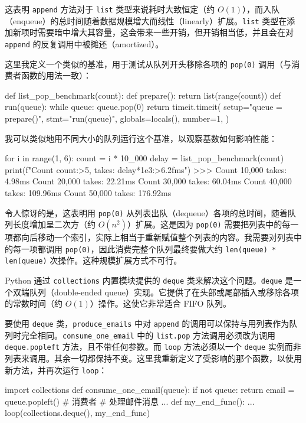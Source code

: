 这表明 \texttt{append} 方法对于 \texttt{list} 类型来说耗时大致恒定（约 $O(1)$），而入队（enqueue）的总时间随着数据规模增大而线性（linearly）扩展。\texttt{list} 类型在添加新项时需要暗中增大其容量，这会带来一些开销，但开销相当低，并且会在对 \texttt{append} 的反复调用中被摊还（amortized）。

这里我定义一个类似的基准，用于测试从队列开头移除各项的 \texttt{pop(0)} 调用（与消费者函数的用法一致）：

\begin{codebox}[python]
def list_pop_benchmark(count):
    def prepare():
        return list(range(count))
    def run(queue):
        while queue:
            queue.pop(0)
    return timeit.timeit(
        setup="queue = prepare()",
        stmt="run(queue)",
        globals=locals(),
        number=1,
    )
\end{codebox}

我可以类似地用不同大小的队列运行这个基准，以观察基数如何影响性能：

\begin{codebox}[python]
for i in range(1, 6):
    count = i * 10_000
    delay = list_pop_benchmark(count)
    print(f"Count {count:>5,} takes: {delay*1e3:>6.2f}ms")
>>>
Count 10,000 takes:   4.98ms
Count 20,000 takes:  22.21ms
Count 30,000 takes:  60.04ms
Count 40,000 takes: 109.96ms
Count 50,000 takes: 176.92ms
\end{codebox}

令人惊讶的是，这表明用 \texttt{pop(0)} 从列表出队（dequeue）各项的总时间，随着队列长度增加呈二次方（约 $O(n^2)$）扩展。这是因为 \texttt{pop(0)} 需要把列表中的每一项都向后移动一个索引，实际上相当于重新赋值整个列表的内容。我需要对列表中的每一项都调用 \texttt{pop(0)}，因此消费完整个队列最终要做大约 \texttt{len(queue) * len(queue)} 次操作。这种规模扩展方式不可行。

Python 通过 \texttt{collections} 内置模块提供的 \texttt{deque} 类来解决这个问题。\texttt{deque} 是一个双端队列（double-ended queue）实现。它提供了在头部或尾部插入或移除各项的常数时间（约 $O(1)$）操作。这使它非常适合 FIFO 队列。

要使用 \texttt{deque} 类，\texttt{produce\_emails} 中对 \texttt{append} 的调用可以保持与用列表作为队列时完全相同。\texttt{consume\_one\_email} 中的 \texttt{list.pop} 方法调用必须改为调用 \texttt{deque.popleft} 方法，且不带任何参数。而 \texttt{loop} 方法必须以一个 \texttt{deque} 实例而非列表来调用。其余一切都保持不变。这里我重新定义了受影响的那个函数，以使用新方法，并再次运行 \texttt{loop}：

\begin{codebox}[python]
import collections
def consume_one_email(queue):
    if not queue:
        return
    email = queue.popleft()  # 消费者
    # 处理邮件消息
    ...
def my_end_func():
    ...
loop(collections.deque(), my_end_func)
\end{codebox}

